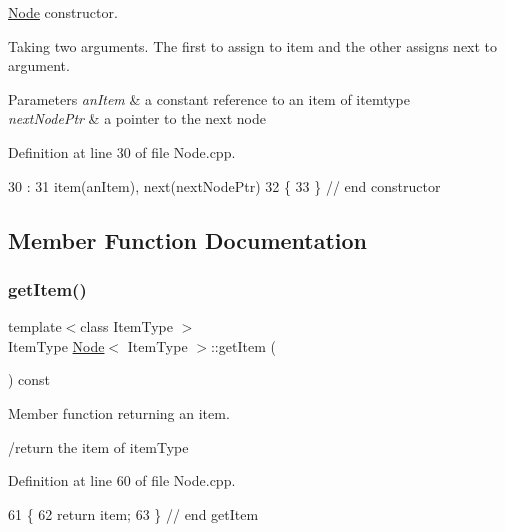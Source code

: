 \hyperlink{classNode}{Node} constructor. 

Taking two arguments. The first to assign to item and the other assigns next to argument. 
\begin{DoxyParams}{Parameters}
{\em an\+Item} & a constant reference to an item of itemtype \\
\hline
{\em next\+Node\+Ptr} & a pointer to the next node \\
\hline
\end{DoxyParams}


Definition at line 30 of file Node.\+cpp.


\begin{DoxyCode}
30                                                                         :
31     item(anItem), next(nextNodePtr)
32 \{
33 \} \textcolor{comment}{// end constructor}
\end{DoxyCode}


\subsection{Member Function Documentation}
\mbox{\label{classNode_a6c08caef312b6f2f69b5e090cf047514}} 
\subsubsection{\texorpdfstring{get\+Item()}{getItem()}}
{\footnotesize\ttfamily template$<$class Item\+Type $>$ \\
Item\+Type \hyperlink{classNode}{Node}$<$ Item\+Type $>$\+::get\+Item (\begin{DoxyParamCaption}{ }\end{DoxyParamCaption}) const}



Member function returning an item. 

/return the item of item\+Type 

Definition at line 60 of file Node.\+cpp.


\begin{DoxyCode}
61 \{
62     \textcolor{keywordflow}{return} item;
63 \} \textcolor{comment}{// end getItem}
\end{DoxyCode}
\mbox{\label{classNode_a3eb0c96e03a3fd46ea1cff4c305bbedd}} 
